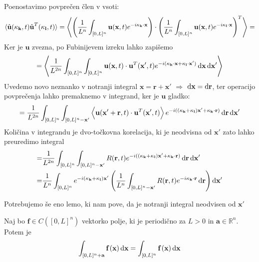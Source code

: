 \documentclass[mat2, tisk]{fmfdelo}
\newcommand{\R}{\mathbb R}
\newcommand{\bd}{\textbf}
\begin{document}
Poenostavimo povprečen člen v vsoti: 
\begin{align*}
  \langle \hat{\bd{u}}(\bd{\text{$\kappa$}}_\bd{k}, t) \hat{\bd{u}}^T(\bd{\text{$\kappa$}}_\bd{l}, t) \rangle = \left\langle \left(\frac{1}{L^n} \int_{[0, L]^n} \bd{u}(\bd{x}, t) e^{-i\bd{\text{$\kappa$}}_{\bd{k}}\cdot \bd{x}} \right) \cdot \left(\frac{1}{L^n} \int_{[0, L]^n} \bd{u}(\bd{x}, t) e^{-i\bd{\text{$\kappa$}}_\bd{l} \cdot \bd{x}} \right)^T \right\rangle = 
\end{align*}
Ker je $\bd{u}$ zvezna, po Fubinijevem izreku lahko zapišemo 
\begin{align*}
= \left\langle \frac{1}{L^{2n}} \int_{[0, L]^{n}} \int_{[0, L]^{n}} \bd{u}(\bd{x}, t) \cdot \bd{u}^T(\bd{x}', t) e^{-i(\bd{\text{$\kappa$}}_{\bd{k}}\cdot \bd{x} + \bd{\text{$\kappa$}}_{\bd{l}}\cdot \bd{x}')} \dif\bd{x} \dif\bd{x}' \right\rangle
\end{align*}
Uvedemo novo neznanko v notranji integral $\bd{x} = \bd{r} + \bd{x}'$ $\Longrightarrow$ $\dif\bd{x} = \dif\bd{r}$, ter operacijo povprečenja lahko premaknemo v integrand, ker 
je $\bd{u}$ gladko:
\begin{align*}
= \frac{1}{L^{2n}} \int_{[0, L]^{n}} \int_{[0, L]^{n} - \bd{x}'} \left\langle\bd{u}(\bd{x}' + \bd{r}, t) \cdot \bd{u}^T(\bd{x}', t)\right\rangle  e^{-i((\bd{\text{$\kappa$}}_{\bd{k}} + \bd{\text{$\kappa$}}_{\bd{l}})\bd{x}' + \bd{\text{$\kappa$}}_{\bd{k}} \cdot \bd{r})} \dif\bd{r} \dif\bd{x}' 
\end{align*}
Količina v integrandu je dvo-točkovna korelacija, ki je neodvisna od $\bd{x}'$
zato lahko preuredimo integral 
\begin{align*}
  =& \frac{1}{L^{2n}} \int_{[0, L]^{n}} \int_{[0, L]^{n} - \bd{x}'} R(\bd{r}, t) e^{-i((\bd{\text{$\kappa$}}_{\bd{k}} + \bd{\text{$\kappa$}}_{\bd{l}})\bd{x}' + \bd{\text{$\kappa$}}_{\bd{k}} \cdot \bd{r})} \dif\bd{r} \dif\bd{x}' \\
  =& \frac{1}{L^{n}} \int_{[0, L]^{n}} e^{-i(\bd{\text{$\kappa$}}_{\bd{k}} + \bd{\text{$\kappa$}}_{\bd{l}})\bd{x}'}\left(\frac{1}{L^n}\int_{[0, L]^{n} - \bd{x}'} R(\bd{r}, t) e^{-i\bd{\text{$\kappa$}}_{\bd{k}} \cdot \bd{r}} \dif\bd{r}\right) \dif\bd{x}'
\end{align*}

Potrebujemo še eno lemo, ki nam pove, da je notranji integral 
neodvisen od $\bd{x}'$

\begin{lema}
Naj bo $\bd{f} \in C([0, L]^n)$ vektorko polje, ki je periodično za $L>0$ in $\bd{a}\in \R^n$. Potem je 
\begin{equation*}
\int_{[0, L]^n + \bd{a}}\bd{f}\,(\bd{x}) \dif\bd{x} = \int_{[0, L]^n} \bd{f}\,(\bd{x}) \dif\bd{x}
\end{equation*} 
\end{lema}
\end{document}
